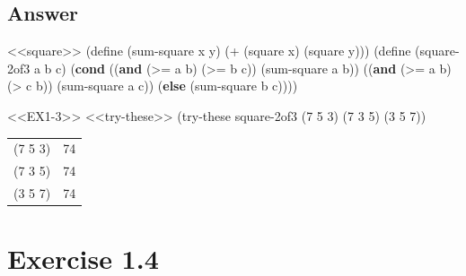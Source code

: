 \documentclass[
]{article}
\newenvironment{Shaded}{}{}
\newcommand{\DecValTok}[1]{\textcolor[rgb]{0.25,0.63,0.44}{#1}}
\newcommand{\ExtensionTok}[1]{#1}
\newcommand{\FunctionTok}[1]{\textcolor[rgb]{0.02,0.16,0.49}{#1}}
\newcommand{\KeywordTok}[1]{\textcolor[rgb]{0.00,0.44,0.13}{\textbf{#1}}}
\newcommand{\NormalTok}[1]{#1}
\newcommand{\OperatorTok}[1]{\textcolor[rgb]{0.40,0.40,0.40}{#1}}
\begin{document}
\hypertarget{answer-2}{%
\subsection{Answer}\label{answer-2}}

\hypertarget{EX1-3}{%
\label{EX1-3}}%
\begin{Shaded}
\begin{Highlighting}[numbers=left,,]
\NormalTok{\textless{}\textless{}square\textgreater{}\textgreater{}}
\NormalTok{(}\ExtensionTok{define}\FunctionTok{ }\NormalTok{(sum{-}square x y)}
\NormalTok{  (}\OperatorTok{+}\NormalTok{ (square x) (square y)))}
\NormalTok{(}\ExtensionTok{define}\FunctionTok{ }\NormalTok{(square{-}2of3 a b c)}
\NormalTok{  (}\KeywordTok{cond}\NormalTok{ ((}\KeywordTok{and}\NormalTok{ (}\OperatorTok{\textgreater{}=}\NormalTok{ a b) (}\OperatorTok{\textgreater{}=}\NormalTok{ b c)) (sum{-}square a b))}
\NormalTok{        ((}\KeywordTok{and}\NormalTok{ (}\OperatorTok{\textgreater{}=}\NormalTok{ a b) (}\OperatorTok{\textgreater{}}\NormalTok{ c b)) (sum{-}square a c))}
\NormalTok{        (}\KeywordTok{else}\NormalTok{ (sum{-}square b c))))}
\end{Highlighting}
\end{Shaded}

\begin{Shaded}
\begin{Highlighting}[numbers=left,,]
\NormalTok{\textless{}\textless{}EX1{-}3\textgreater{}\textgreater{}}
\NormalTok{\textless{}\textless{}try{-}these\textgreater{}\textgreater{}}
\NormalTok{ (try{-}these square{-}2of3 \textquotesingle{}(}\DecValTok{7} \DecValTok{5} \DecValTok{3}\NormalTok{)}
\NormalTok{                        \textquotesingle{}(}\DecValTok{7} \DecValTok{3} \DecValTok{5}\NormalTok{)}
\NormalTok{                        \textquotesingle{}(}\DecValTok{3} \DecValTok{5} \DecValTok{7}\NormalTok{))}
\end{Highlighting}
\end{Shaded}

\begin{longtable}[]{@{}ll@{}}
\toprule
\endhead
(7 5 3) & 74 \\
(7 3 5) & 74 \\
(3 5 7) & 74 \\
\bottomrule
\end{longtable}

\hypertarget{exercise-1.4}{%
\section{Exercise 1.4}\label{exercise-1.4}}
\end{document}
